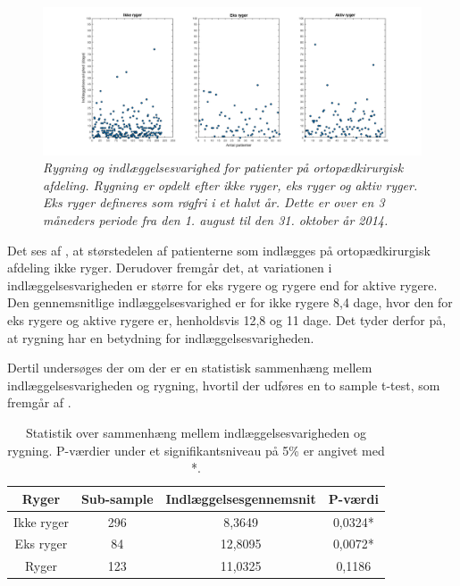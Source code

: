 \begin{figure}[H]
	\centering
	\includegraphics[scale=0.35]{figures/rygerogindlaeg}
	\caption{\textit{Rygning og indlæggelsesvarighed for patienter på ortopædkirurgisk afdeling. Rygning er opdelt efter ikke ryger, eks ryger og aktiv ryger. Eks ryger defineres som røgfri i et halvt år. Dette er over en 3 måneders periode fra den 1. august til den 31. oktober år 2014.}}
	\label{rygningogindlaeggelse}
\end{figure}


\noindent
Det ses af , at størstedelen af patienterne som indlægges på ortopædkirurgisk afdeling ikke ryger. Derudover fremgår det, at variationen i indlæggelsesvarigheden er større for eks rygere og rygere end for aktive rygere. Den gennemsnitlige indlæggelsesvarighed er for ikke rygere 8,4 dage, hvor den for eks rygere og aktive rygere er, henholdsvis 12,8 og 11 dage. Det tyder derfor på, at rygning har en betydning for indlæggelsesvarigheden. 

Dertil undersøges der om der er en statistisk sammenhæng mellem indlæggelsesvarigheden og rygning, hvortil der udføres en to sample t-test, som fremgår af .

\begin{table}[H]
\centering
\begin{tabular}{|c|c|c|c|}
\hline
\textbf{Ryger} & \textbf{Sub-sample} & \textbf{Indlæggelsesgennemsnit} & \textbf{P-værdi} \\ \hline
Ikke ryger        & 296                 & 8,3649                          & 0,0324*          \\ \hline
Eks ryger         & 84                  & 12,8095                         & 0,0072*          \\ \hline
Ryger             & 123                 & 11,0325                         & 0,1186           \\ \hline
\end{tabular}
\caption{Statistik over sammenhæng mellem indlæggelsesvarigheden og rygning. P-værdier under et signifikantsniveau på 5\% er angivet med *.}
\label{rygerindlaegtab}
\end{table}

